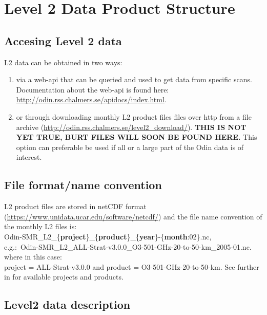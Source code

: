 \chapter{Level 2 Data Product Structure}
\label{chapter:L2_structure}


\section{Accesing Level 2 data}

L2 data can be obtained in two ways:

\begin{enumerate}

\item via a web-api that can be queried and used to get data from
  specific scans. Documentation about the web-api is found here: 
  \url{http://odin.rss.chalmers.se/apidocs/index.html}.

\item or through downloading monthly L2 product files files over http
  from a file archive (\url{http://odin.rss.chalmers.se/level2_download/}).
  \textbf{THIS IS NOT YET TRUE, BURT FILES WILL SOON BE FOUND HERE.}
  This option can preferable be used if all or a large part of the
  Odin data is of interest.

\end{enumerate}


\section{File format/name convention}

L2 product files are stored in netCDF format (\url{https://www.unidata.ucar.edu/software/netcdf/})
and the file name convention of the monthly L2 files is: \\
Odin-SMR\_L2\_\{\textbf{project}\}\_\{\textbf{product}\}\_\{\textbf{year}\}-\{\textbf{month}:02\}.nc, \\
e.g.:\
Odin-SMR\_L2\_ALL-Strat-v3.0.0\_O3-501-GHz-20-to-50-km\_2005-01.nc.\\
where in this case:\\
project = ALL-Strat-v3.0.0 and product = O3-501-GHz-20-to-50-km.
See further in \cite{dds} for available projects and products.


\section{Level2 data description}

